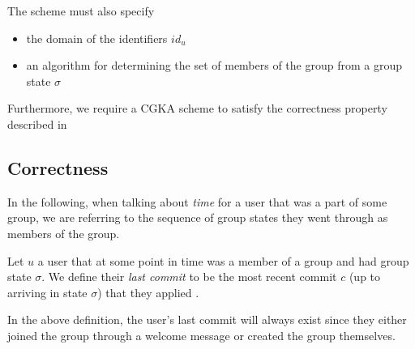 \begin{definition}[CGKA]
	The scheme must also specify
	\begin{itemize}
		\item the domain of the identifiers $id_u$
		\item an algorithm for determining the set of members of the group from a group state $\sigma$
	\end{itemize}

	Furthermore, we require a CGKA scheme to satisfy the correctness property described in 
\end{definition}

\subsection{Correctness}




In the following, when talking about \emph{time} for a user that was a part of some group, we are referring to the sequence of group states they went through as members of the group.

\begin{definition}
	Let $u$ a user that at some point in time was a member of a group and had group state $\sigma$. We define their \emph{last commit} to be the most recent commit $c$ (up to arriving in state $\sigma$) that they applied .
\end{definition}

In the above definition, the user's last commit will always exist since they either joined the group through a welcome message or created the group themselves.

